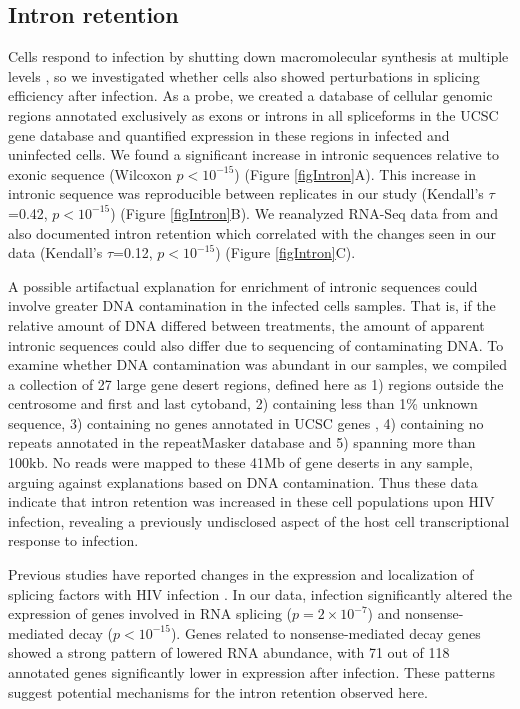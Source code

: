 \documentclass[../sherrill-Mix_thesis.tex]{subfiles}
\begin{document}
	
	\subsection{Intron retention} %
		Cells respond to infection by shutting down macromolecular synthesis at multiple levels \citep{Iwase1997,Johnstone1998,Williams1999,Ramana2000,Liang2006}, so we investigated whether cells also showed perturbations in splicing efficiency after infection. As a probe, we created a database of cellular genomic regions annotated exclusively as exons or introns in all spliceforms in the UCSC gene database \citep{Hsu2006} and quantified expression in these regions in infected and uninfected cells. We found a significant increase in intronic sequences relative to exonic sequence (Wilcoxon $p<10^{-15}$) (Figure \ref{figIntron}A).  This increase in intronic sequence was reproducible between replicates in our study (Kendall's $\tau$=0.42, $p<10^{-15}$) (Figure \ref{figIntron}B). We reanalyzed RNA-Seq data from \citet{Chang2011} and also documented intron retention which correlated with the changes seen in our data (Kendall's $\tau$=0.12, $p<10^{-15}$) (Figure \ref{figIntron}C).

		A possible artifactual explanation for enrichment of intronic sequences could involve greater DNA contamination in the infected cells samples. That is, if the relative amount of DNA differed between treatments, the amount of apparent intronic sequences could also differ due to sequencing of contaminating DNA. To examine whether DNA contamination was abundant in our samples, we compiled a collection of 27 large gene desert regions, defined here as 1) regions outside the centrosome and first and last cytoband, 2) containing less than 1\% unknown sequence, 3) containing no genes annotated in UCSC genes \citep{Hsu2006}, 4) containing no repeats annotated in the repeatMasker database \citep{Jurka2005} and 5) spanning more than 100kb. No reads were mapped to these 41Mb of gene deserts in any sample, arguing against explanations based on DNA contamination. Thus these data indicate that intron retention was increased in these cell populations upon HIV infection, revealing a previously undisclosed aspect of the host cell transcriptional response to infection.
		
		  Previous studies have reported changes in the expression and localization of splicing factors with HIV infection \citep{Maldarelli1998,Dowling2008,Monette2009}. In our data, \hivEight{} infection significantly altered the expression of genes involved in RNA splicing ($p=2\times10^{-7}$) and nonsense-mediated decay ($p<10^{-15}$). Genes related to nonsense-mediated decay genes showed a strong pattern of lowered RNA abundance, with 71 out of 118 annotated genes significantly lower in expression after infection. These patterns suggest potential mechanisms for the intron retention observed here.
		
\end{document}
